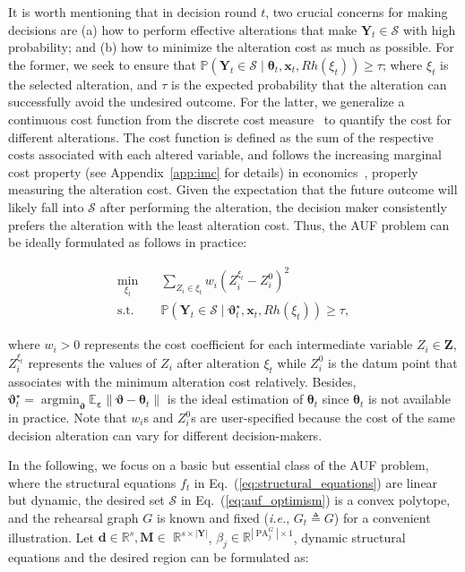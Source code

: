 \documentclass{article}
\theoremstyle{plain}
\theoremstyle{definition}
\theoremstyle{remark}
\def \ie {\textit{i.e.}}
\def \Eq {Eq.}
\def \x {\mathbf{x}}
\def \Z {\mathbf{Z}}
\def \sS {\mathcal{S}}
\def \Y {\mathbf{Y}}
\def \PA {\operatorname{PA}}
\begin{document}
It is worth mentioning that in decision round $t$, two crucial concerns for making decisions are 
(a) how to perform effective alterations that make $\Y_t\in \sS$ with high probability; and 
(b) how to minimize the alteration cost as much as possible.
For the former, we seek to ensure that $\mathbb{P}\left(\Y_t\in\sS \mid \bm{\theta}_t, \x_t, Rh(\xi_t)\right) \geq \tau$; 
where $\xi_t$ is the selected alteration, and $\tau$ is the expected probability that the alteration can successfully avoid the undesired outcome.
For the latter, we generalize a continuous cost function from the discrete cost measure~\citep{zhouzh2011cost} to quantify the cost for different alterations.  
The cost function is defined as the sum of the respective costs associated with each altered variable, 
and follows the increasing marginal cost property (see Appendix~\ref{app:imc} for details) in economics~\citep{mankiw2020economics}, 
properly measuring the alteration cost.
Given the expectation that the future outcome will likely fall into $\sS$ after performing the alteration, the decision maker consistently prefers the alteration with the least alteration cost.
Thus, the AUF problem can be ideally formulated as follows in practice:

\vskip -0.1in
\begin{equation}
  \label{eq:auf_optimism}
  \begin{aligned}
    \mathop{\min}_{\xi_t}&\quad \sum_{Z_i\in \xi_t} w_i \left(Z_i^{\xi_t} - Z_i^0\right)^2\\
    \text{s.t.}&\quad \mathbb{P}\left(\Y_t\in\sS \mid \bm{\vartheta}_t^\star, \x_t, Rh(\xi_t)\right)\geq \tau, 
  \end{aligned}
\end{equation}
\vskip -0.04in

where $w_i>0$ represents the cost coefficient for each intermediate variable $Z_i\in\Z$, 
$Z_i^{\xi_t}$ represents the values of $Z_i$ after alteration $\xi_t$ while $Z_i^0$ is the datum point that associates with the minimum alteration cost relatively. 
Besides, $\bm{\vartheta}_t^\star = \mathop{\arg\min}_{\bm{\vartheta}}\mathbb{E}_{\bm{\varepsilon}}\|\bm{\vartheta}-\bm{\theta}_t\|$ is the ideal estimation of $\bm{\theta}_t$ since $\bm{\theta}_t$ is not available in practice. 
Note that $w_i$s and $Z_i^0$s are user-specified because the cost of the same decision alteration can vary for different decision-makers.

In the following, we focus on a basic but essential class of the AUF problem, 
where the structural equations $f_{t}$ in \Eq~(\ref{eq:structural_equations}) are linear but dynamic, the desired set $\sS$ in \Eq~(\ref{eq:auf_optimism}) is a convex polytope, and the rehearsal graph $G$ is known and fixed (\ie, $G_t\triangleq G$) for a convenient illustration. 
Let $\mathbf{d} \in \mathbb{R}^s, \mathbf{M} \in$ $\mathbb{R}^{s \times|\mathbf{Y}|}$, $\beta_j \in \mathbb{R}^{\left|\PA_j^G\right| \times 1}$, dynamic structural equations and the desired region can be formulated as:
\end{document}
